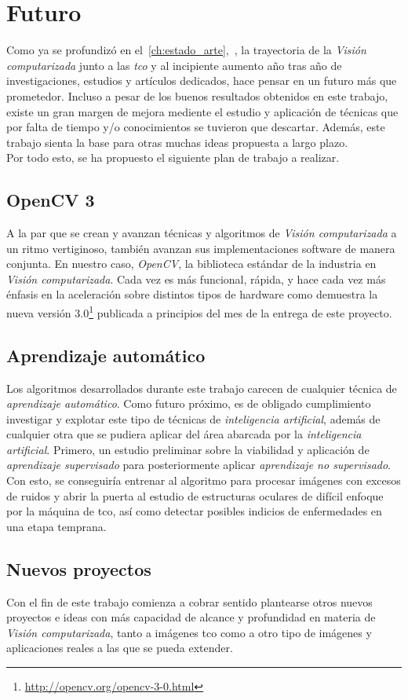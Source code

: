 \chapter{Futuro}
Como ya se profundizó en
el~\autoref{ch:estado_arte},~, la trayectoria
de la \emph{Visión computarizada} junto a las \emph{\gls{tco}} y al
incipiente aumento año tras año de investigaciones, estudios y
artículos dedicados, hace pensar en un futuro más que
prometedor. Incluso a pesar de los buenos resultados obtenidos en este
trabajo, existe un gran margen de mejora mediente el estudio y
aplicación de técnicas que por falta de tiempo y/o conocimientos se
tuvieron que descartar. Además, este trabajo sienta la base para otras
muchas ideas propuesta a largo plazo.\\
Por todo esto, se ha propuesto el siguiente plan de trabajo a
realizar.

\section{OpenCV 3}
A la par que se crean y avanzan técnicas y algoritmos de \emph{Visión
  computarizada} a un ritmo vertiginoso, también avanzan sus
implementaciones software de manera conjunta. En nuestro caso,
\emph{OpenCV}, la biblioteca estándar de la industria en \emph{Visión
  computarizada}. Cada vez es más funcional, rápida, y hace cada vez
más énfasis en la aceleración sobre distintos tipos de hardware
como demuestra la nueva versión
$3.0$\footnote{\url{http://opencv.org/opencv-3-0.html}} publicada a
principios del mes de la entrega de este proyecto.

\section{Aprendizaje automático}
Los algoritmos desarrollados durante este trabajo carecen de cualquier
técnica de \emph{aprendizaje automático}. Como futuro próximo, es de
obligado cumplimiento investigar y explotar este tipo de técnicas de
\emph{inteligencia artificial}, además de cualquier otra que se pudiera
aplicar del área abarcada por la \emph{inteligencia
  artificial}. Primero, un estudio preliminar sobre la viabilidad y
aplicación de \emph{aprendizaje supervisado} para posteriormente
aplicar \emph{aprendizaje no supervisado}. Con esto, se conseguiría
entrenar al algoritmo para procesar imágenes con excesos de ruidos y
abrir la puerta al estudio de estructuras oculares de difícil enfoque
por la máquina de \gls{tco}, así como detectar posibles indicios de
enfermedades en una etapa temprana.

\section{Nuevos proyectos}
Con el fin de este trabajo comienza a cobrar sentido plantearse otros
nuevos proyectos e ideas con más capacidad de alcance y profundidad en
materia de \emph{Visión computarizada}, tanto a imágenes \gls{tco} como
a otro tipo de imágenes y aplicaciones reales a las que se pueda extender.
